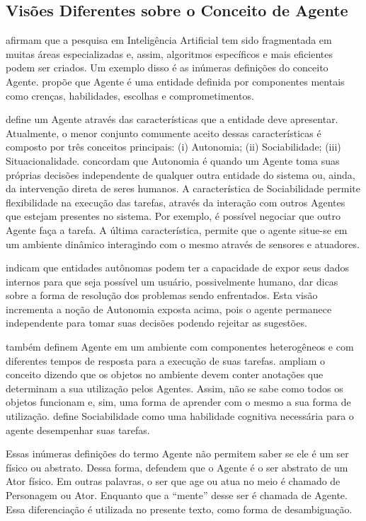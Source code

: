 \subsection{Visões Diferentes sobre o Conceito de Agente} \label{sec:aopca}

\citet{laird2001human} afirmam que a pesquisa em Inteligência Artificial tem
sido fragmentada em muitas áreas especializadas e, assim, algoritmos
específicos e mais eficientes podem ser criados. Um exemplo disso é as
inúmeras definições do conceito Agente. \citet{shoham1993agent}
propõe que Agente é uma entidade definida por componentes mentais como
crenças, habilidades, escolhas e comprometimentos.

\citet{franklin1997agent} define um Agente através das características que a
entidade deve apresentar.  Atualmente, o menor conjunto comumente aceito
dessas características é composto por três conceitos principais: (i)
Autonomia; (ii) Sociabilidade; (iii) Situacionalidade.
\citet{roadmap} concordam que Autonomia é quando um Agente
toma suas próprias decisões independente de qualquer outra entidade do sistema
ou, ainda, da intervenção direta de seres humanos. A característica de
Sociabilidade permite flexibilidade na execução das tarefas, através da
interação com outros Agentes que estejam presentes no sistema. Por exemplo, é
possível negociar que outro Agente faça a tarefa. A última característica,
permite que o agente situe-se em um ambiente dinâmico interagindo com o mesmo
através de sensores e atuadores.

\citet{ingrand1992architecture} indicam que entidades autônomas podem ter a
capacidade de expor seus dados internos para que seja possível um usuário,
possivelmente humano, dar dicas sobre a forma de resolução dos problemas sendo
enfrentados. Esta visão incrementa a noção de Autonomia exposta acima,
pois o agente permanece independente para tomar suas decisões podendo rejeitar
as sugestões.

 também definem Agente em um ambiente com
componentes heterogêneos e com diferentes tempos de resposta para a execução
de suas tarefas. \citet{doyle1998annotated} ampliam o conceito dizendo que os
objetos no ambiente devem conter anotações que determinam a sua utilização
pelos Agentes. Assim, não se sabe como todos os objetos funcionam e, sim, uma
forma de aprender com o mesmo a sua forma de utilização.
\citet{shoham1993agent} define Sociabilidade como uma habilidade cognitiva
necessária para o agente desempenhar suas tarefas.

Essas inúmeras definições do termo Agente não permitem saber se ele é um ser
físico ou abstrato. Dessa forma, \citet{nareyek2001review,damiano2008emotions}
defendem que o Agente é o ser abstrato de um Ator físico. Em outras palavras,
o ser que age ou atua no meio é chamado de Personagem ou Ator. Enquanto que a
``mente'' desse ser é chamada de Agente. Essa diferenciação é utilizada no
presente texto, como forma de desambiguação.
